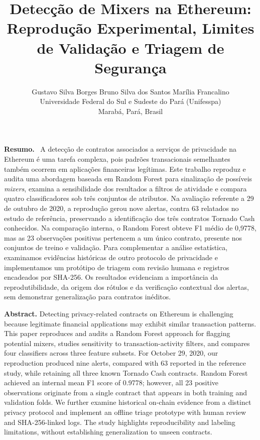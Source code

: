 \documentclass[12pt,a4paper]{article}
\title{Detecção de Mixers na Ethereum: Reprodução Experimental, Limites de Validação e Triagem de Segurança}
\author{Gustavo Silva Borges \quad Bruno Silva dos Santos \quad Marília Francalino\\[4pt]
\small Universidade Federal do Sul e Sudeste do Pará (Unifesspa)\\
\small Marabá, Pará, Brasil}
\date{}
\newenvironment{resumo}{\par\noindent\textbf{Resumo.}\ }{\par}}
\newenvironment{resumo}{\par\noindent\textbf{Resumo.}\ }{\par}
\begin{document}
\maketitle
\begin{resumo}
A detecção de contratos associados a serviços de privacidade na Ethereum é uma tarefa complexa, pois padrões transacionais semelhantes também ocorrem em aplicações financeiras legítimas. Este trabalho reproduz e audita uma abordagem baseada em Random Forest para sinalização de possíveis \emph{mixers}, examina a sensibilidade dos resultados a filtros de atividade e compara quatro classificadores sob três conjuntos de atributos. Na avaliação referente a 29 de outubro de 2020, a reprodução gerou nove alertas, contra 63 relatados no estudo de referência, preservando a identificação dos três contratos Tornado Cash conhecidos. Na comparação interna, o Random Forest obteve F1 médio de 0,9778, mas as 23 observações positivas pertencem a um único contrato, presente nos conjuntos de treino e validação. Para complementar a análise estatística, examinamos evidências históricas de outro protocolo de privacidade e implementamos um protótipo de triagem com revisão humana e registros encadeados por SHA-256. Os resultados evidenciam a importância da reprodutibilidade, da origem dos rótulos e da verificação contextual dos alertas, sem demonstrar generalização para contratos inéditos.
\end{resumo}

\medskip\noindent\textbf{Abstract.}
Detecting privacy-related contracts on Ethereum is challenging because legitimate financial applications may exhibit similar transaction patterns. This paper reproduces and audits a Random Forest approach for flagging potential mixers, studies sensitivity to transaction-activity filters, and compares four classifiers across three feature subsets. For October 29, 2020, our reproduction produced nine alerts, compared with 63 reported in the reference study, while retaining all three known Tornado Cash contracts. Random Forest achieved an internal mean F1 score of 0.9778; however, all 23 positive observations originate from a single contract that appears in both training and validation folds. We further examine historical on-chain evidence from a distinct privacy protocol and implement an offline triage prototype with human review and SHA-256-linked logs. The study highlights reproducibility and labeling limitations, without establishing generalization to unseen contracts.
\par\medskip
\end{document}
